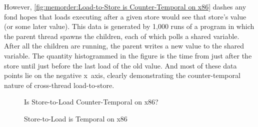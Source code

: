 {	However,
	\cref{fig:memorder:Load-to-Store is Counter-Temporal on x86}
	dashes any fond hopes that loads executing after a given store
	would see that store's value (or some later value).
	This data is generated by 1,000 runs of a program in which the
	parent thread spawns the children, each of which polls a shared
	variable.
	After all the children are running, the parent writes a new
	value to the shared variable.
	The quantity histogrammed in the figure is the time from just
	after the store until just before the last load of the old value.
	And most of these data points lie on the negative x~axis, clearly
	demonstrating the counter-temporal nature of cross-thread
	load-to-store.

\begin{figure}
\centering
{}
\caption{Is Store-to-Load Counter-Temporal on x86?}
\label{fig:memorder:Is Store-to-Load Counter-Temporal on x86?}
\end{figure}

\begin{figure}
\centering
{}
\caption{Store-to-Load is Temporal on x86}
\label{fig:memorder:Store-to-Load is Temporal on x86}
\end{figure}

}

